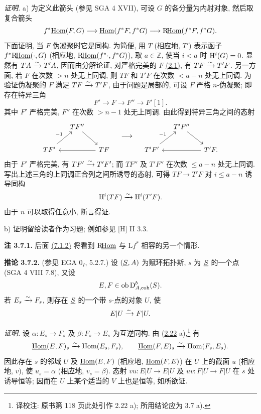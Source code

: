 \emph{证明.} a) 为定义此箭头 (参见 SGA 4 XVII), 可设 \(G\) 的各分量为内射对象, 然后取复合箭头
\[
  f^*\underline{\operatorname{Hom}}(F,G)\longrightarrow \underline{\operatorname{Hom}}(f^*F,f^*G)
  \longrightarrow \mathrm R\!\underline{\operatorname{Hom}}(f^*F,f^*G).
\]
下面证明, 当 \(F\) 伪凝聚时它是同构. 为简便, 用 \(T\) (相应地, \(T'\)) 表示函子 \(f^*\mathrm R\!\underline{\operatorname{Hom}}(\cdot,G)\) (相应地, \(\mathrm R\!\underline{\operatorname{Hom}}(f^*\cdot,f^*G)\)), 取 \(a\in\mathbb Z\), 使当 \(i<a\) 时 \(\mathrm H^i(G)=0\). 显然有 \(TA\xrightarrow{\sim} T'A\), 因而由分解论证, 对严格完美的 \(F\) \hyperlink{sga6.e01.def.2-1}{(2.1)}, 有 \(TF\xrightarrow{\sim} T'F\). 另一方面, 若 \(F\) 在次数 \(>n\) 处无上同调, 则 \(TF\) 和 \(T'F\) 在次数 \(<a-n\) 处无上同调. 为验证伪凝聚的 \(F\) 满足 \(TF\xrightarrow{\sim} T'F\), 由于问题是局部的, 可设 \(F\) 严格 \(n\)-伪凝聚; 即存在特异三角
\[
  F'\longrightarrow F\longrightarrow F''\longrightarrow F'[1].
\]
其中 \(F'\) 严格完美, \(F''\) 在次数 \(>n-1\) 处无上同调. 由此得到特异三角之间的态射
\[
\begin{tikzcd}[column sep=small]
& TF'' \arrow[dr] & \\
TF' \arrow[ur,"-1"] && TF \arrow[ll]
\end{tikzcd}
\quad\longrightarrow\quad
\begin{tikzcd}[column sep=small]
& T'F'' \arrow[dr] & \\
T'F' \arrow[ur,"-1"] && T'F \arrow[ll] .
\end{tikzcd}
\]
由于 \(F'\) 严格完美, 有 \(TF'\xrightarrow{\sim} T'F'\); 而 \(TF''\) 及 \(T'F''\) 在次数 \(\leq a-n\) 处无上同调. 写出上述三角的上同调正合列之间所诱导的态射, 可得 \(TF\to T'F\) 对 \(i\leq a-n\) 诱导同构
\[
  \mathrm H^i(TF)\xrightarrow{\sim} \mathrm H^i(T'F)
.
\]
 由于 \(n\) 可以取得任意小, 断言得证.

b) 证明留给读者作为习题; 例如参见 [H] II 3.3.

\textbf{注 3.7.1.} 后面 \hyperlink{sga6.e01.prop.7-1-2}{(7.1.2)} 将看到 \(\mathrm R\!\underline{\operatorname{Hom}}\) 与 \(\mathrm L f^*\) 相容的另一个情形.

\textbf{推论 3.7.2.} (参见 EGA \(0_I\), 5.2.7.) 设 \((\underline S,A)\) 为赋环拓扑斯, \(s\) 为 \(\underline S\) 的一个点 (SGA 4 VIII 7.8), 又设
\[
  E,F\in\operatorname{ob}\mathrm D^b_{A,\operatorname{coh}}(S).
\]
若 \(E_s\xrightarrow{\sim} F_s\), 则存在 \(\underline S\) 的一个带 \(s\)-点的对象 \(U\), 使
\[
  E|U\xrightarrow{\sim} F|U.
\]

\emph{证明.} 设 \(\alpha:E_s\to F_s\) 及 \(\beta:F_s\to E_s\) 为互逆同构. 由 (\hyperlink{sga6.e01.prop.3-7}{2.22} a),\footnote{译校注: 原书第 118 页此处引作 2.22 a); 所用结论应为 3.7 a).} 有
\[
  \underline{\operatorname{Hom}}(E,F)_s\xrightarrow{\sim}\operatorname{Hom}(E_s,F_s),
  \qquad
  \underline{\operatorname{Hom}}(F,E)_s\xrightarrow{\sim}\operatorname{Hom}(F_s,E_s).
\]
因此存在 \(s\) 的邻域 \(U\) 及 \(\underline{\operatorname{Hom}}(E,F)\) (相应地, \(\underline{\operatorname{Hom}}(F,E)\)) 在 \(U\) 上的截面 \(u\) (相应地, \(v\)), 使 \(u_s=\alpha\) (相应地, \(v_s=\beta\)). 态射 \(vu:E|U\to E|U\) 及 \(uv:F|U\to F|U\) 在 \(s\) 处诱导恒等; 因而在 \(U\) 上某个适当的 \(V\) 上也是恒等, 如所欲证.


